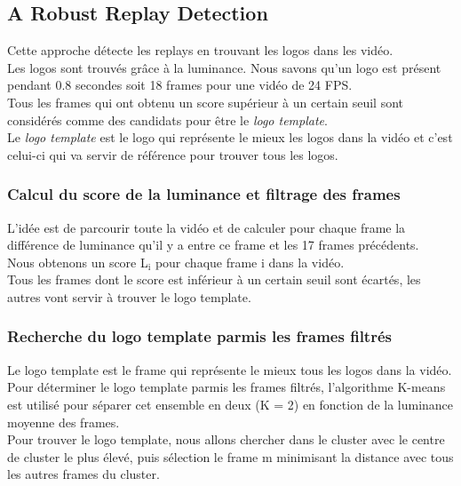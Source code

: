 \documentclass[11pt]{article}
\begin{document}
\subsection{A Robust Replay Detection}
\label{sec:orgbd6a386}
Cette approche \cite{xu11_robus_replay_detec_algor_soccer_video} détecte les replays en trouvant les logos dans les vidéo.\\
Les logos sont trouvés grâce à la luminance. Nous savons qu'un logo est présent pendant 0.8 secondes soit 18 frames pour une vidéo de 24 FPS.\\
Tous les frames qui ont obtenu un score supérieur à un certain seuil sont considérés comme des candidats pour être le \emph{logo template}.\\
Le \emph{logo template} est le logo qui représente le mieux les logos dans la vidéo et c'est celui-ci qui va servir de référence pour trouver tous les logos.\\

\subsubsection{Calcul du score de la luminance et filtrage des frames}
\label{sec:org31a5a38}
L'idée est de parcourir toute la vidéo et de calculer pour chaque frame la différence de luminance qu'il y a entre ce frame et les 17 frames précédents.\\
Nous obtenons un score L\(_{\text{i}}\) pour chaque frame i dans la vidéo.\\
Tous les frames dont le score est inférieur à un certain seuil sont écartés, les autres vont servir à trouver le logo template.\\

\subsubsection{Recherche du logo template parmis les frames filtrés}
\label{sec:org952eee7}
Le logo template est le frame qui représente le mieux tous les logos dans la vidéo.\\
Pour déterminer le logo template parmis les frames filtrés, l'algorithme K-means est utilisé pour séparer cet ensemble en deux (K = 2) en fonction de la luminance moyenne des frames.\\
Pour trouver le logo template, nous allons chercher dans le cluster avec le centre de cluster le plus élevé, puis sélection le frame m minimisant la distance avec tous les autres frames du cluster.\\
\end{document}
